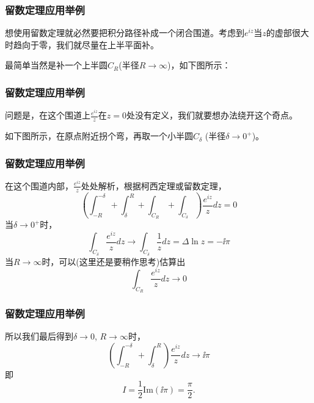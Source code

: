 \documentclass[CJK,13pt]{beamer}
\begin{document}
\begin{frame}
  \frametitle{留数定理应用举例}
  
  想使用留数定理就必然要把积分路径补成一个闭合围道。考虑到$e^{iz}$当$z$的虚部很大时趋向于零，我们就尽量在上半平面补。

  最简单当然是补一个上半圆$C_R$(半径$R\rightarrow \infty$)，如下图所示：
  

  
  
  
\end{frame}

\begin{frame}
  \frametitle{留数定理应用举例}
  
  问题是，在这个围道上$\frac{e^{iz}}{z}$在$z=0$处没有定义，我们就要想办法绕开这个奇点。

  如下图所示，在原点附近拐个弯，再取一个小半圆$C_\delta$ (半径$\delta \rightarrow 0^+$)。
  

  
\end{frame}


\begin{frame}
  \frametitle{留数定理应用举例}
    
{\small  在这个围道内部，$\frac{e^{iz}}{z}$处处解析，根据柯西定理或留数定理，
  $$\left(\int_{-R}^{-\delta} + \int_{\delta}^{R} + \int_{C_R} + \int_{C_\delta}\right)\frac{e^{iz}}{z} dz = 0  $$
 当$\delta \rightarrow 0^+$时，
 $$\int_{C_\delta} \frac{e^{iz}}{z}dz  \rightarrow \int_{C_\delta} \frac{1}{z}dz = \Delta \ln z = - \ii \pi $$
 当$R\rightarrow \infty$时，可以(这里还是要稍作思考)估算出
 $$\int_{C_R} \frac{e^{iz}}{z}dz \rightarrow 0$$}
  
\end{frame}

\begin{frame}
  \frametitle{留数定理应用举例}
    
    所以我们最后得到$\delta\rightarrow 0$, $R\rightarrow \infty$时，
    $$\left(\int_{-R}^{-\delta} + \int_{\delta}^{R}\right)  \frac{e^{iz}}{z} dz \rightarrow \ii\pi $$
    即
    $$ I = \frac{1}{2}\mathrm{Im}(\ii\pi) = \frac{\pi}{2}.$$
  
\end{frame}
\end{document}
